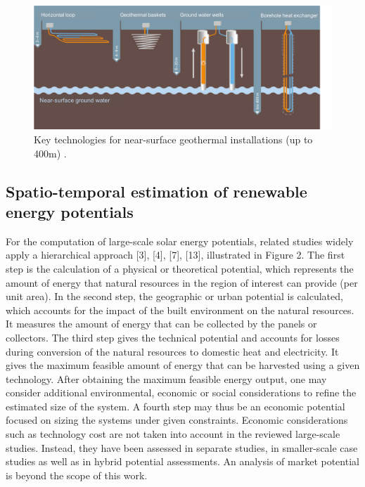 \begin{figure}
\centering 
\includegraphics[width=\textwidth]{images/Figs/shallow_technologies.png} 
\caption{Key technologies for near-surface geothermal installations (up to 400m) \cite{noauthor_arten_nodate}.}
\label{fig:shallow_gshp} 
\end{figure}

\subsection{Spatio-temporal estimation of renewable energy potentials}

For the computation of large-scale solar energy potentials, related studies widely apply a hierarchical approach [3], [4], [7], [13], illustrated in Figure 2. The first step is the calculation of a physical or theoretical potential, which represents the amount of energy that natural resources in the region of interest can provide (per unit area). In the second step, the geographic or urban potential is calculated, which accounts for the impact of the built environment on the natural resources. It measures the amount of energy that can be collected by the panels or collectors. The third step gives the technical potential and accounts for losses during conversion of the natural resources to domestic heat and electricity. It gives the maximum feasible amount of energy that can be harvested using a given technology. After obtaining the maximum feasible energy output, one may consider additional environmental, economic or social considerations to refine the estimated size of the system. A fourth step may thus be an economic potential focused on sizing the systems under given constraints. Economic considerations such as technology cost are not taken into account in the reviewed large-scale studies. Instead, they have been assessed in separate studies, in smaller-scale case studies as well as in hybrid potential assessments. An analysis of market potential is beyond the scope of this work. 
 
